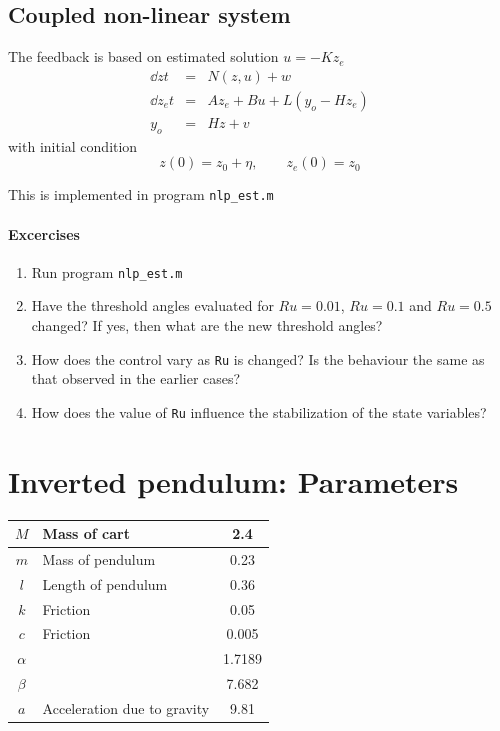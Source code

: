 \documentclass[12pt]{article}
\begin{document}

\subsection{Coupled non-linear system}

The feedback is based on estimated solution $u = -K z_e$
\begin{eqnarray*}
\dd{z}{t} &=& N(z, u) + w \\
\dd{z_e}{t} &=& A z_e + B u + L(y_o - H z_e) \\
y_o &=& H z + v
\end{eqnarray*}
with initial condition
\[
z(0) = z_0 + \eta, \qquad z_e(0) = z_0
\]

This is implemented in program {\tt nlp\_est.m}

\paragraph{Excercises}

\begin{enumerate}

\item Run program {\tt nlp\_est.m}

\item Have the threshold angles evaluated for $Ru=0.01$, $Ru=0.1$ and $Ru=0.5$ changed? If yes, then what are the new threshold angles?

\item How does the control vary as {\tt Ru} is changed? Is the behaviour the same as that observed in the earlier cases?

\item How does the value of {\tt Ru} influence the stabilization of the state variables?

\end{enumerate}


\section{Inverted pendulum: Parameters}


\begin{center}
\begin{tabular}{|c|l|c|}
\hline
$M$ & Mass of cart &  2.4  \\
\hline
$m$ & Mass of pendulum &  0.23 \\
\hline
$l$ & Length of pendulum & 0.36 \\
\hline
$k$ & Friction & 0.05 \\
\hline
$c$ & Friction & 0.005 \\
\hline
$\alpha$ &  & 1.7189 \\
\hline
$\beta$ &  &  7.682 \\
\hline
$a$ & Acceleration due to gravity & 9.81 \\
\hline
\end{tabular}
\end{center}
\end{document}
